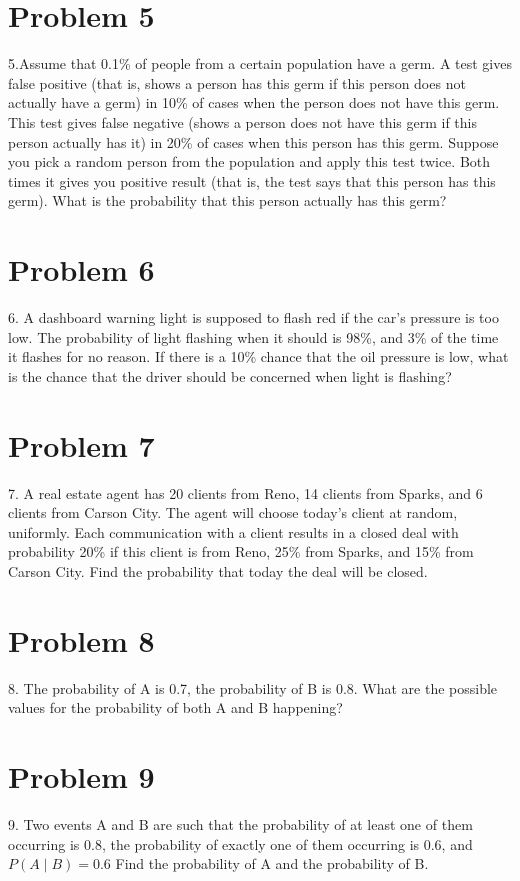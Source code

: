 \documentclass{article}
\begin{document}
	\section*{Problem 5} 
	5.Assume that 0.1\% of people from a certain population have a germ. A test gives false positive (that is, shows a person has this germ if this person does not actually have a germ) in 10\% of cases when the person does not have this germ. This test gives false negative (shows a person does not have this germ if this person actually has it) in 20\% of cases when this person has this germ. Suppose you pick a random person from the population and apply this test twice. Both times it gives you positive result (that is, the test says that this person has this germ). What is the probability that this person actually has this germ?
	
	\section*{Problem 6} 
6. A dashboard warning light is supposed to flash red if the car's pressure is too low. The probability of light flashing when it should is 98\%, and 3\% of the time it flashes for no reason. If there is a 10\% chance that the oil pressure is low, what is the chance that the driver should be concerned when light is flashing?
	\section*{Problem 7} 
	7. A real estate agent has 20 clients from Reno, 14 clients from Sparks, and 6 clients from Carson City. The agent will choose today's client at random, uniformly. Each communication with a client results in a closed deal with probability 20\% if this client is from Reno, 25\% from Sparks, and 15\% from Carson City. Find the probability that today the deal will be closed. 

	\section*{Problem 8} 
	8. The probability of A is 0.7, the probability of B is 0.8. What are the possible values for the probability of both A and B happening?

	\section*{Problem 9} 
	9. Two events A and B are such that the probability of at least one of them occurring is 0.8, the probability of exactly one of them occurring is 0.6, and  $P(A\mid B) = 0.6$  Find the probability of A and the probability of B. 
	
\end{document}
